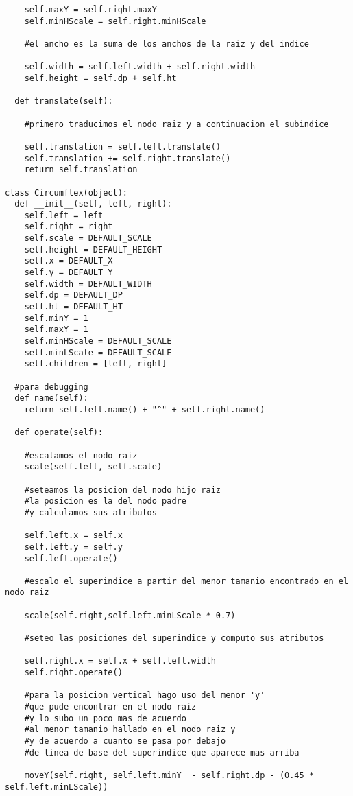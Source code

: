 \begin{verbatim}
    self.maxY = self.right.maxY
    self.minHScale = self.right.minHScale

    #el ancho es la suma de los anchos de la raiz y del indice

    self.width = self.left.width + self.right.width
    self.height = self.dp + self.ht
    
  def translate(self):

    #primero traducimos el nodo raiz y a continuacion el subindice

    self.translation = self.left.translate()
    self.translation += self.right.translate()
    return self.translation

class Circumflex(object):
  def __init__(self, left, right):
    self.left = left
    self.right = right
    self.scale = DEFAULT_SCALE
    self.height = DEFAULT_HEIGHT
    self.x = DEFAULT_X
    self.y = DEFAULT_Y
    self.width = DEFAULT_WIDTH
    self.dp = DEFAULT_DP
    self.ht = DEFAULT_HT
    self.minY = 1
    self.maxY = 1
    self.minHScale = DEFAULT_SCALE
    self.minLScale = DEFAULT_SCALE
    self.children = [left, right]

  #para debugging
  def name(self):
    return self.left.name() + "^" + self.right.name()

  def operate(self):

    #escalamos el nodo raiz
    scale(self.left, self.scale)

    #seteamos la posicion del nodo hijo raiz
    #la posicion es la del nodo padre
    #y calculamos sus atributos

    self.left.x = self.x
    self.left.y = self.y
    self.left.operate()

    #escalo el superindice a partir del menor tamanio encontrado en el nodo raiz

    scale(self.right,self.left.minLScale * 0.7)
    
    #seteo las posiciones del superindice y computo sus atributos

    self.right.x = self.x + self.left.width
    self.right.operate()

    #para la posicion vertical hago uso del menor 'y' 
    #que pude encontrar en el nodo raiz
    #y lo subo un poco mas de acuerdo 
    #al menor tamanio hallado en el nodo raiz y
    #y de acuerdo a cuanto se pasa por debajo 
    #de linea de base del superindice que aparece mas arriba

    moveY(self.right, self.left.minY  - self.right.dp - (0.45 * self.left.minLScale))



\end{verbatim}
